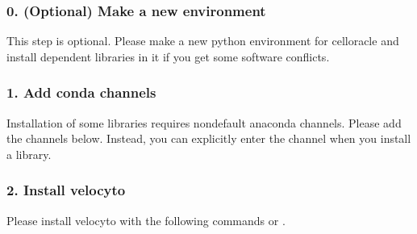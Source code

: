 \documentclass[letterpaper,10pt,english]{sphinxmanual}
\begin{document}
\subsubsection{0. (Optional) Make a new environment}
\label{\detokenize{installation/index:optional-make-a-new-environment}}
This step is optional. Please make a new python environment for celloracle and install dependent libraries in it if you get some software conflicts.

\begin{sphinxVerbatim}[commandchars=\\\{\}]
    
  
\end{sphinxVerbatim}


\subsubsection{1. Add conda channels}
\label{\detokenize{installation/index:add-conda-channels}}
Installation of some libraries requires non\sphinxhyphen{}default anaconda channels. Please add the channels below. Instead, you can explicitly enter the channel when you install a library.

\begin{sphinxVerbatim}[commandchars=\\\{\}]
    
    
    
\end{sphinxVerbatim}


\subsubsection{2. Install velocyto}
\label{\detokenize{installation/index:install-velocyto}}
Please install velocyto with the following commands or  .

\begin{sphinxVerbatim}[commandchars=\\\{\}]
            
\end{sphinxVerbatim}
\end{document}
